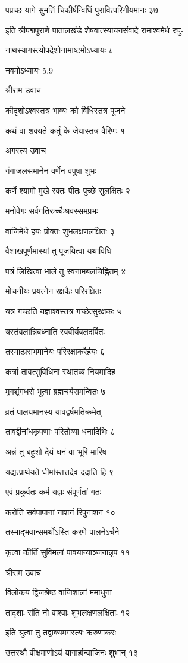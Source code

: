 पप्रच्छ यागे सुमतिं चिकीर्षन्विधिं पुरावित्परिगीयमानः ३७

इति श्रीपद्मपुराणे पातालखंडे शेषवात्स्यायनसंवादे रामाश्वमेधे रघु-

नाथस्यागस्त्योपदेशोनामाष्टमोऽध्यायः ८

नवमोऽध्यायः 5.9

श्रीराम उवाच

कीदृशोऽश्वस्तत्र भाव्यः को विधिस्तत्र पूजने

कथं वा शक्यते कर्तुं के जेयास्तत्र वैरिणः १

अगस्त्य उवाच

गंगाजलसमानेन वर्णेन वपुषा शुभः

कर्णे श्यामो मुखे रक्तः पीतः पुच्छे सुलक्षितः २

मनोवेगः सर्वगतिरुच्चैःश्रवस्समप्रभः

वाजिमेधे हयः प्रोक्तः शुभलक्षणलक्षितः ३

वैशाखपूर्णमास्यां तु पूजयित्वा यथाविधि

पत्रं लिखित्वा भाले तु स्वनामबलचिह्नितम् ४

मोचनीयः प्रयत्नेन रक्षकैः परिरक्षितः

यत्र गच्छति यज्ञाश्वस्तत्र गच्छेत्सुरक्षकः ५

यस्तंबलान्निबध्नाति स्ववीर्यबलदर्पितः

तस्मात्प्रसभमानेयः परिरक्षाकरैर्हयः ६

कर्त्रा तावत्सुविधिना स्थातव्यं नियमादिह

मृगशृंगधरो भूत्वा ब्रह्मचर्यसमन्वितः ७

व्रतं पालयमानस्य यावद्वर्षमतिक्रमेत्

तावद्दीनांधकृपणाः परितोष्या धनादिभिः ८

अन्नं तु बहुशो देयं धनं वा भूरि मारिष

यद्यत्प्रार्थयते धीमांस्तत्तदेव ददाति हि ९

एवं प्रकुर्वतः कर्म यज्ञः संपूर्णतां गतः

करोति सर्वपापानां नाशनं रिपुनाशन १०

तस्माद्भवान्समर्थोऽस्ति करणे पालनेऽर्चने

कृत्वा कीर्तिं सुविमलां पावयान्याञ्जनान्नृप ११

श्रीराम उवाच

विलोकय द्विजश्रेष्ठ वाजिशालां ममाधुना

तादृशाः संति नो वाश्वाः शुभलक्षणलक्षिताः १२

इति श्रुत्वा तु तद्वाक्यमगस्त्यः करुणाकरः

उत्तस्थौ वीक्षमाणोऽयं यागार्हान्वाजिनः शुभान् १३


